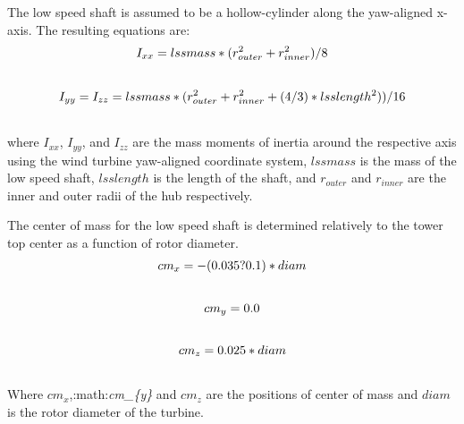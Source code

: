 \documentclass[letterpaper,10pt,openany,oneside]{sphinxmanual}
\begin{document}
The low speed shaft is assumed to be a hollow-cylinder along the yaw-aligned x-axis.  The resulting equations are:
\begin{gather}
\begin{split}I_{xx}=lssmass * (r_{outer}^2 + r_{inner}^2) / 8\end{split}\notag\\\begin{split}\end{split}\notag
\end{gather}\begin{gather}
\begin{split}I_{yy}=I_{zz}=lssmass * (r_{outer}^2 + r_{inner}^2 + (4/3) * lsslength^2)) / 16\end{split}\notag\\\begin{split}\end{split}\notag
\end{gather}
where $I_{xx}$, $I_{yy}$, and $I_{zz}$ are the mass moments of inertia around the respective axis using the wind turbine yaw-aligned coordinate system, $lssmass$ is the mass of the low speed shaft, $lsslength$ is the length of the shaft, and $r_{outer}$ and $r_{inner}$ are the inner and outer radii of the hub respectively.

The center of mass for the low speed shaft is determined relatively to the tower top center as a function of rotor diameter.
\begin{gather}
\begin{split}cm_{x} = -(0.035 ? 0.1) * diam\end{split}\notag\\\begin{split}\end{split}\notag
\end{gather}\begin{gather}
\begin{split}cm_{y} = 0.0\end{split}\notag\\\begin{split}\end{split}\notag
\end{gather}\begin{gather}
\begin{split}cm_{z} = 0.025 * diam\end{split}\notag\\\begin{split}\end{split}\notag
\end{gather}
Where $cm_{x}$,:math:\emph{cm\_\{y\}} and $cm_{z}$ are the positions of center of mass and $diam$ is the rotor diameter of the turbine.
\end{document}
